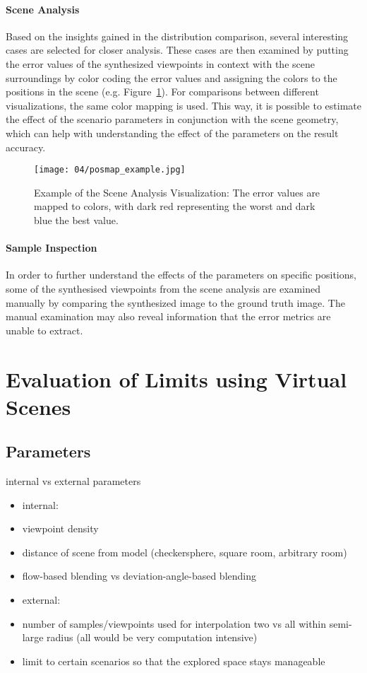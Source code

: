 \paragraph{Scene Analysis}
Based on the insights gained in the distribution comparison, several interesting cases are selected for closer analysis. These cases are then examined by putting the error values of the synthesized viewpoints in context with the scene surroundings by color coding the error values and assigning the colors to the positions in the scene (e.g. Figure~\ref{fig:posmap_example}). For comparisons between different visualizations, the same color mapping is used. This way, it is possible to estimate the effect of the scenario parameters in conjunction with the scene geometry, which can help with understanding the effect of the parameters on the result accuracy.

\begin{figure}
		\centering
		\texttt{[image: 04/posmap\_example.jpg]}
		\caption{Example of the Scene Analysis Visualization: The error values are mapped to colors, with dark red representing the worst and dark blue the best value.}
		\label{fig:posmap_example}
\end{figure}

\paragraph{Sample Inspection}
In order to further understand the effects of the parameters on specific positions, some of the synthesised viewpoints from the scene analysis are examined manually by comparing the synthesized image to the ground truth image. The manual examination may also reveal information that the error metrics are unable to extract.

\section{Evaluation of Limits using Virtual Scenes}

\subsection{Parameters}
internal vs external parameters
\begin{itemize}
  \item internal:
  \item viewpoint density
  \item distance of scene from model (checkersphere, square room, arbitrary room)
  \item flow-based blending vs deviation-angle-based blending
  \item external:
  \item number of samples/viewpoints used for interpolation \ar two vs all within semi-large radius (all would be very computation intensive)
  \item limit to certain scenarios so that the explored space stays manageable
\end{itemize}

